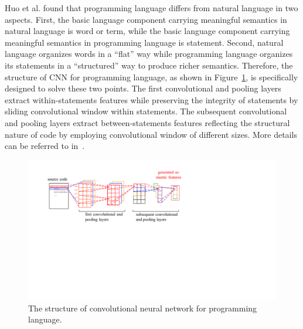 Huo et al. found that programming language %
differs from natural language in two aspects. First, the basic language component carrying meaningful semantics in natural language is word or term, while the basic language component carrying meaningful semantics in programming language is statement. Second, natural language organizes words in a ``flat'' way while programming language organizes its statements in a ``structured'' way to produce richer semantics. Therefore, the structure of CNN for programming language, as shown in Figure~\ref{fig:npcnn}, is specifically designed to solve these two points. The first convolutional and pooling layers extract within-statements features while preserving the integrity of statements by sliding convolutional window within statements. The subsequent convolutional and pooling layers extract between-statements features reflecting the structural nature of code by employing convolutional window of different sizes. More details can be referred to in~\cite{huo2016learning}.

\begin{figure}[hbt]
\centering
\includegraphics[width = \columnwidth]{pic/NPCNN.pdf}
\caption{The structure of convolutional neural network for programming language.}
\label{fig:npcnn}
\end{figure}

